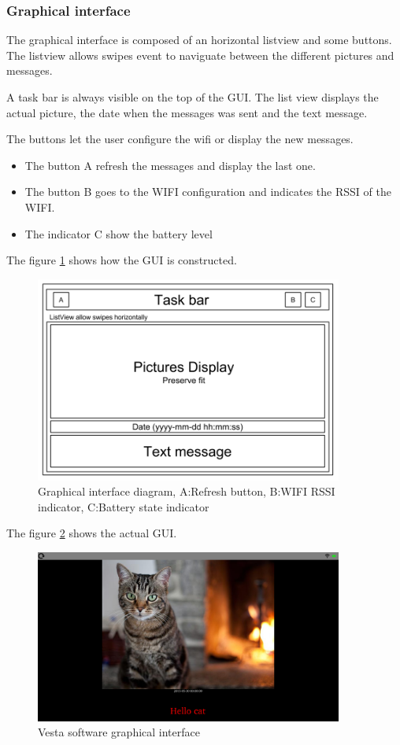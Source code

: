\clearpage

\subsubsection{Graphical interface}
The graphical interface is composed of an horizontal listview and some buttons. The listview allows swipes event to naviguate between the different pictures and messages.

A task bar is always visible on the top of the GUI. The list view displays the actual picture, the date when the messages was sent and the text message.

The buttons let the user configure the wifi or display the new messages.

\begin{itemize}
\item{The button A refresh the messages and display the last one.}
\item{The button B goes to the WIFI configuration and indicates the RSSI of the WIFI.}
\item{The indicator C show the battery level}
\end{itemize}

The figure \ref{fig:gui diagram} shows how the GUI is constructed.

\begin{figure}[!htb]
    \centering
    \includegraphics[width=0.9\textwidth,keepaspectratio]{chap/softFig/GUI_diagram}
    \caption{Graphical interface diagram, A:Refresh button, B:WIFI RSSI indicator, C:Battery state indicator}
    \label{fig:gui diagram}
\end{figure}

The figure \ref{fig:graphical interface} shows the actual GUI.

\begin{figure}[!htb]
    \centering
    \includegraphics[width=0.9\textwidth,keepaspectratio]{chap/softFig/vesta_printscreen}
    \caption{Vesta software graphical interface}
    \label{fig:graphical interface}
\end{figure}


